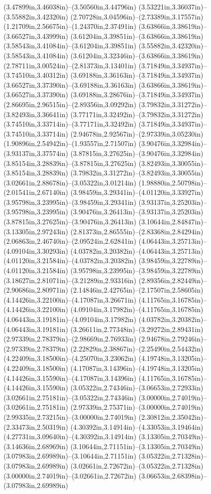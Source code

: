 (3.47899in,3.46038in)--(3.50560in,3.44796in) (3.53221in,3.36037in)--(3.55882in,3.42320in) (2.70728in,3.04596in)--(2.73389in,3.17557in) (1.21709in,2.56675in)--(1.24370in,2.37491in) (3.63866in,3.38619in)--(3.66527in,3.43999in) (3.61204in,3.39851in)--(3.63866in,3.38619in) (3.58543in,3.41084in)--(3.61204in,3.39851in) (3.55882in,3.42320in)--(3.58543in,3.41084in) (3.61204in,3.32346in)--(3.63866in,3.38619in) (2.78711in,3.00524in)--(2.81373in,3.13401in) (3.71849in,3.34937in)--(3.74510in,3.40312in) (3.69188in,3.36163in)--(3.71849in,3.34937in) (3.66527in,3.37390in)--(3.69188in,3.36163in) (3.63866in,3.38619in)--(3.66527in,3.37390in) (3.69188in,3.28676in)--(3.71849in,3.34937in) (2.86695in,2.96515in)--(2.89356in,3.09292in) (3.79832in,3.31272in)--(3.82493in,3.36641in) (3.77171in,3.32492in)--(3.79832in,3.31272in) (3.74510in,3.33714in)--(3.77171in,3.32492in) (3.71849in,3.34937in)--(3.74510in,3.33714in) (2.94678in,2.92567in)--(2.97339in,3.05230in) (1.90896in,2.54942in)--(1.93557in,2.71507in) (3.90476in,3.32984in)--(3.93137in,3.37574in) (3.87815in,3.27625in)--(3.90476in,3.32984in) (3.85154in,3.28839in)--(3.87815in,3.27625in) (3.82493in,3.30055in)--(3.85154in,3.28839in) (3.79832in,3.31272in)--(3.82493in,3.30055in) (3.02661in,2.88678in)--(3.05322in,3.01214in) (1.98880in,2.50798in)--(2.01541in,2.67140in) (3.98459in,3.29341in)--(4.01120in,3.33927in) (3.95798in,3.23995in)--(3.98459in,3.29341in) (3.93137in,3.25203in)--(3.95798in,3.23995in) (3.90476in,3.26413in)--(3.93137in,3.25203in) (3.87815in,3.27625in)--(3.90476in,3.26413in) (3.10644in,2.84847in)--(3.13305in,2.97243in) (2.81373in,2.86555in)--(2.83368in,2.84294in) (2.06863in,2.46740in)--(2.09524in,2.62841in) (4.06443in,3.25713in)--(4.09104in,3.30293in) (4.03782in,3.20382in)--(4.06443in,3.25713in) (4.01120in,3.21584in)--(4.03782in,3.20382in) (3.98459in,3.22789in)--(4.01120in,3.21584in) (3.95798in,3.23995in)--(3.98459in,3.22789in) (3.18627in,2.81071in)--(3.21289in,2.93316in) (2.89356in,2.82449in)--(2.90686in,2.80971in) (2.14846in,2.42765in)--(2.17507in,2.58605in) (4.14426in,3.22100in)--(4.17087in,3.26671in) (4.11765in,3.16785in)--(4.14426in,3.22100in) (4.09104in,3.17982in)--(4.11765in,3.16785in) (4.06443in,3.19181in)--(4.09104in,3.17982in) (4.03782in,3.20382in)--(4.06443in,3.19181in) (3.26611in,2.77348in)--(3.29272in,2.89431in) (2.97339in,2.78379in)--(2.98669in,2.76933in) (2.94678in,2.79246in)--(2.97339in,2.78379in) (2.22829in,2.38867in)--(2.25490in,2.54432in) (4.22409in,3.18500in)--(4.25070in,3.23062in) (4.19748in,3.13205in)--(4.22409in,3.18500in) (4.17087in,3.14396in)--(4.19748in,3.13205in) (4.14426in,3.15590in)--(4.17087in,3.14396in) (4.11765in,3.16785in)--(4.14426in,3.15590in) (3.05322in,2.74346in)--(3.06653in,2.72933in) (3.02661in,2.75181in)--(3.05322in,2.74346in) (3.00000in,2.74019in)--(3.02661in,2.75181in) (2.97339in,2.75371in)--(3.00000in,2.74019in) (2.99335in,2.73215in)--(3.00000in,2.74019in) (2.30812in,2.35042in)--(2.33473in,2.50319in) (4.30392in,3.14914in)--(4.33053in,3.19464in) (4.27731in,3.09640in)--(4.30392in,3.14914in) (3.13305in,2.70349in)--(3.14636in,2.68969in) (3.10644in,2.71151in)--(3.13305in,2.70349in) (3.07983in,2.69989in)--(3.10644in,2.71151in) (3.05322in,2.71328in)--(3.07983in,2.69989in) (3.02661in,2.72672in)--(3.05322in,2.71328in) (3.00000in,2.74019in)--(3.02661in,2.72672in) (3.06653in,2.68398in)--(3.07983in,2.69989in) 